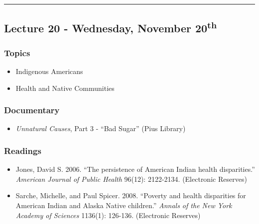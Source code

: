 \documentclass[]{book}
\providecommand{\tightlist}{%
  \setlength{\itemsep}{0pt}\setlength{\parskip}{0pt}}
\begin{document}
\begin{center}\rule{0.5\linewidth}{\linethickness}\end{center}

\hypertarget{lecture-20---wednesday-november-20th}{%
\subsection*{\texorpdfstring{Lecture 20 - Wednesday, November 20\textsuperscript{th}}{Lecture 20 - Wednesday, November 20th}}\label{lecture-20---wednesday-november-20th}}

\hypertarget{topics-25}{%
\subsubsection*{Topics}\label{topics-25}}

\begin{itemize}
\tightlist
\item
  Indigenous Americans
\item
  Health and Native Communities
\end{itemize}

\hypertarget{documentary-2}{%
\subsubsection*{Documentary}\label{documentary-2}}

\begin{itemize}
\tightlist
\item
  \emph{Unnatural Causes}, Part 3 - ``Bad Sugar'' (Pius Library)
\end{itemize}

\hypertarget{readings-23}{%
\subsubsection*{Readings}\label{readings-23}}

\begin{itemize}
\tightlist
\item
  Jones, David S. 2006. ``The persistence of American Indian health disparities.'' \emph{American Journal of Public Health} 96(12): 2122-2134. (Electronic Reserves)
\item
  Sarche, Michelle, and Paul Spicer. 2008. ``Poverty and health disparities for American Indian and Alaska Native children.'' \emph{Annals of the New York Academy of Sciences} 1136(1): 126-136. (Electronic Reserves)
\end{itemize}
\end{document}
